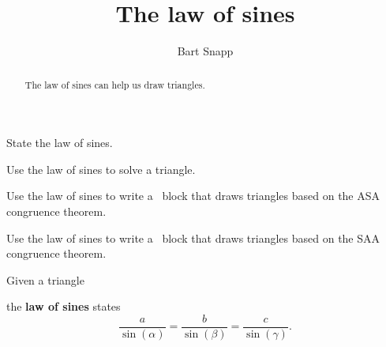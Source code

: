 \documentclass[noauthor,nooutcomes,12pt]{ximera}
\title{The law of sines}
\author{Bart Snapp}
\begin{document}
\begin{abstract}
  The law of sines can help us draw triangles.
\end{abstract}
\maketitle

\begin{listOutcomes}
\item State the law of sines.
\item Use the law of sines to solve a triangle.
\item Use the law of sines to write a \snap\ block that draws triangles
  based on the ASA congruence theorem.
\item Use the law of sines to write a \snap\ block that draws
  triangles based on the SAA congruence theorem.
\end{listOutcomes}
\mynewpage

Given a triangle
\begin{center}
\end{center}
the \textbf{law of sines} states
\[
\frac{a}{\sin(\alpha)} = \frac{b}{\sin(\beta)} = \frac{c}{\sin(\gamma)}.
\]
\end{document}
